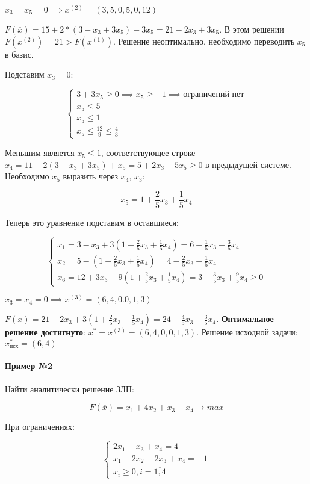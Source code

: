 \documentclass{article}
\begin{document}
$x_3 = x_5 = 0 \implies x^{(2)} = (3,5,0,5,0,12)$

$F(\overline{x}) = 15 + 2 * (3 - x_3 + 3x_5) - 3x_5 = 21 - 2x_3 + 3x_5$. В этом решении $F(x^{(2)}) = 21 > F(x^{(1)})$. Решение неоптимально, необходимо переводить $x_5$ в базис.

Подставим $x_3 = 0$:

$$
\begin{cases}
    3 + 3x_5 \ge 0 \implies x_5 \ge -1 \implies \text{ограничений нет}\\
    x_5 \le 5 \\
    x_5 \le 1 \\
    x_5 \le \frac{12}{9} \le \frac{4}{3}
\end{cases}
$$

Меньшим является $x_{5} \le 1$, соответствующее строке $x_4 = 11 - 2 (3 - x_3 + 3x_5) + x_5 = 5 + 2x_3 - 5x_5 \ge 0$ в предыдущей системе. Необходимо $x_5$ выразить через $x_4$, $x_3$:

$$
x_5 = 1 + \frac{2}{5} x_3 + \frac{1}{5} x_4
$$

Теперь это уравнение подставим в оставшиеся:

$$
\begin{cases}
  x_1 = 3 - x_3 + 3 (1 + \frac{2}{5} x_3 + \frac{1}{5} x_4) = 6 + \frac{1}{5} x_3 - \frac{3}{5} x_4 \\
  x_2 = 5 - (1 + \frac{2}{5} x_3 + \frac{1}{5} x_4) = 4 - \frac{2}{5}x_3 + \frac{1}{5} x_4 \\
  x_6 = 12 + 3x_3 - 9 (1 + \frac{2}{5} x_3 + \frac{1}{5} x_4) = 3 - \frac{3}{5} x_3 + \frac{9}{5} x_4 \ge 0
\end{cases}
$$

$x_3 = x_4 = 0 \implies x^{(3)} = (6, 4, 0. 0, 1, 3)$

$F(\overline{x}) = 21 - 2x_3 + 3 (1 + \frac{2}{5} x_3 + \frac{1}{5} x_4) = 24 - \frac{4}{5} x_3 - \frac{3}{5} x_4$. \textbf{Оптимальное решение достигнуто}: $x^{*} = x^{(3)} = (6, 4, 0, 0, 1, 3)$. Решение исходной задачи: $x^{*}_{\text{исх}} = (6, 4)$

\paragraph{Пример №2}

Найти аналитически решение ЗЛП:

$$
F(\overline{x}) = x_1 + 4x_2 + x_3 - x_4 \to max
$$

При ограничениях:

$$
\begin{cases}
    2x_1 - x_3 + x_4 = 4 \\
    x_1 - 2x_2 - 2x_3 + x_4 = -1 \\
    x_i \ge 0, i = \overline{1, 4}
\end{cases}
$$
\end{document}
